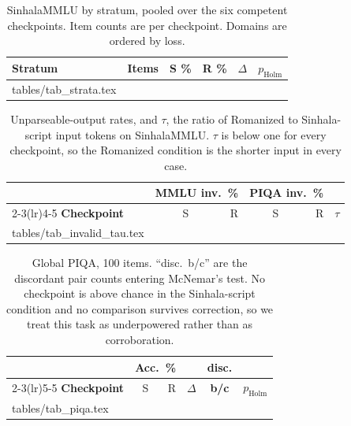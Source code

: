 \documentclass[11pt]{article}
\makeatletter
\newcommand{\rows}[1]{\@@input #1 }
\makeatother
\begin{document}
\begin{table}[t]
\centering\small
\setlength{\tabcolsep}{4pt}
\begin{tabular}{@{}lrrrrr@{}}
\toprule
\textbf{Stratum} & \textbf{Items} & \textbf{S \%} & \textbf{R \%}
& \boldmath$\Delta$ & \boldmath$p_{\text{Holm}}$ \\
\midrule
\rows{tables/tab_strata.tex}
\bottomrule
\end{tabular}
\caption{SinhalaMMLU by stratum, pooled over the six competent checkpoints. Item
counts are per checkpoint. Domains are ordered by loss.}
\label{tab:strata}
\end{table}

\begin{table}[t]
\centering\small
\setlength{\tabcolsep}{3.2pt}
\begin{tabular}{@{}lrrrrr@{}}
\toprule
& \multicolumn{2}{c}{\textbf{MMLU inv.\ \%}} & \multicolumn{2}{c}{\textbf{PIQA inv.\ \%}} & \\
\cmidrule(lr){2-3}\cmidrule(lr){4-5}
\textbf{Checkpoint} & S & R & S & R & \boldmath$\tau$ \\
\midrule
\rows{tables/tab_invalid_tau.tex}
\bottomrule
\end{tabular}
\caption{Unparseable-output rates, and $\tau$, the ratio of Romanized to
Sinhala-script input tokens on SinhalaMMLU. $\tau$ is below one for every
checkpoint, so the Romanized condition is the shorter input in every case.}
\label{tab:invalidtau}
\end{table}

\begin{table}[t]
\centering\small
\setlength{\tabcolsep}{3.4pt}
\begin{tabular}{@{}lrrrcr@{}}
\toprule
& \multicolumn{2}{c}{Acc.\ \%} & & \textbf{disc.} & \\
\cmidrule(lr){2-3}\cmidrule(lr){5-5}
\textbf{Checkpoint} & S & R & \boldmath$\Delta$ & \textbf{b/c}
& \boldmath$p_{\text{Holm}}$ \\
\midrule
\rows{tables/tab_piqa.tex}
\bottomrule
\end{tabular}
\caption{Global PIQA, 100 items. ``disc.\ b/c'' are the discordant pair counts
entering McNemar's test. No checkpoint is above chance in the Sinhala-script
condition and no comparison survives correction, so we treat this task as
underpowered rather than as corroboration.}
\label{tab:piqa}
\end{table}
\end{document}
